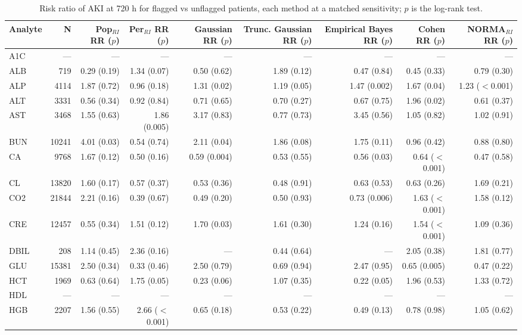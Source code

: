 \begin{table}[ht]
\centering
\footnotesize
\caption{Risk ratio of AKI at 720 h for flagged vs unflagged patients, each method at a matched sensitivity; $p$ is the log-rank test.}
\begin{tabular}{lrrrrrrrr}
\toprule
Analyte & N & Pop$_{RI}$ RR ($p$) & Per$_{RI}$ RR ($p$) & Gaussian RR ($p$) & Trunc. Gaussian RR ($p$) & Empirical Bayes RR ($p$) & Cohen RR ($p$) & NORMA$_{RI}$ RR ($p$) \\
\midrule
A1C & --- & --- & --- & --- & --- & --- & --- & --- \\
ALB & 719 & 0.29 (0.19) & 1.34 (0.07) & 0.50 (0.62) & 1.89 (0.12) & 0.47 (0.84) & 0.45 (0.33) & 0.79 (0.30) \\
ALP & 4114 & 1.87 (0.72) & 0.96 (0.18) & 1.31 (0.02) & 1.19 (0.05) & 1.47 (0.002) & 1.67 (0.04) & 1.23 ($<$0.001) \\
ALT & 3331 & 0.56 (0.34) & 0.92 (0.84) & 0.71 (0.65) & 0.70 (0.27) & 0.67 (0.75) & 1.96 (0.02) & 0.61 (0.37) \\
AST & 3468 & 1.55 (0.63) & 1.86 (0.005) & 3.17 (0.83) & 0.77 (0.73) & 3.45 (0.56) & 1.05 (0.82) & 1.02 (0.91) \\
BUN & 10241 & 4.01 (0.03) & 0.54 (0.74) & 2.11 (0.04) & 1.86 (0.08) & 1.75 (0.11) & 0.96 (0.42) & 0.88 (0.80) \\
CA & 9768 & 1.67 (0.12) & 0.50 (0.16) & 0.59 (0.004) & 0.53 (0.55) & 0.56 (0.03) & 0.64 ($<$0.001) & 0.47 (0.58) \\
CL & 13820 & 1.60 (0.17) & 0.57 (0.37) & 0.53 (0.36) & 0.48 (0.91) & 0.63 (0.53) & 0.63 (0.26) & 1.69 (0.21) \\
CO2 & 21844 & 2.21 (0.16) & 0.39 (0.67) & 0.49 (0.20) & 0.50 (0.93) & 0.73 (0.006) & 1.63 ($<$0.001) & 1.58 (0.12) \\
CRE & 12457 & 0.55 (0.34) & 1.51 (0.12) & 1.70 (0.03) & 1.61 (0.30) & 1.24 (0.16) & 1.54 ($<$0.001) & 1.09 (0.36) \\
DBIL & 208 & 1.14 (0.45) & 2.36 (0.16) & --- & 0.44 (0.64) & --- & 2.05 (0.38) & 1.81 (0.77) \\
GLU & 15381 & 2.50 (0.34) & 0.33 (0.46) & 2.50 (0.79) & 0.69 (0.94) & 2.47 (0.95) & 0.65 (0.005) & 0.47 (0.22) \\
HCT & 1969 & 0.63 (0.64) & 1.75 (0.05) & 0.23 (0.06) & 1.07 (0.35) & 0.22 (0.05) & 1.96 (0.53) & 1.33 (0.72) \\
HDL & --- & --- & --- & --- & --- & --- & --- & --- \\
HGB & 2207 & 1.56 (0.55) & 2.66 ($<$0.001) & 0.65 (0.18) & 0.53 (0.22) & 0.49 (0.13) & 0.78 (0.98) & 1.05 (0.62) \\

\end{tabular}
\end{table}
